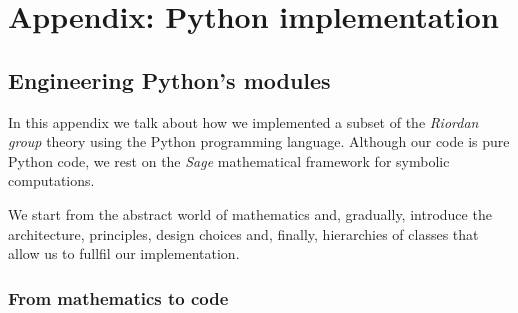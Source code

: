 \chapter{Appendix: Python implementation}

\section{Engineering Python's modules}

In this appendix we talk about how we implemented a subset of the \emph{Riordan
group} theory using the Python programming language.  Although our code is pure
Python code, we rest on the \emph{Sage} \cite{sage} mathematical framework for
symbolic computations.

We start from the abstract world of mathematics and, gradually, introduce the
architecture, principles, design choices and, finally, hierarchies of classes
that allow us to fullfil our implementation.

\subsection{From mathematics to code}
\label{subsection:python:appendix:from:math:to:code}

